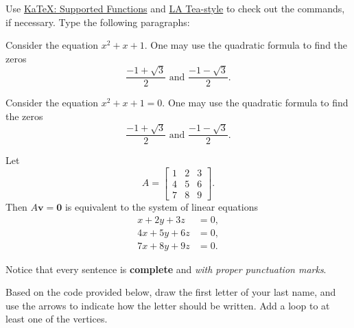 \documentclass{article}
\theoremstyle{definition}
\newcommand{\bzero}{\mathbf{0}}
\newcommand{\bv}{\mathbf{v}}
\begin{document}
Use \href{https://katex.org/docs/supported.html}{KaTeX: Supported Functions} and \href{https://sagelabtw.github.io/LA-Tea/style.html}{LA Tea-style} to check out the commands, if necessary.  Type the following paragraphs:
\medskip

Consider the equation $x^2 + x + 1$.  One may use the quadratic formula to find the zeros
\[\frac{-1 + \sqrt{3}}{2}
\text{ and }
\frac{-1 - \sqrt{3}}{2}.\]





Consider the equation $x^2 + x + 1 = 0$.  One may use the quadratic formula to find the zeros  
\[\frac{-1+\sqrt{3}}{2} \text{ and } \frac{-1-\sqrt{3}}{2}.\]

Let 
\[A = \begin{bmatrix}
 1 & 2 & 3 \\
 4 & 5 & 6 \\
 7 & 8 & 9
\end{bmatrix}.\]
Then $A\bv = \bzero$ is equivalent to the system of linear equations
\[\begin{aligned}
 x + 2y + 3z &= 0, \\
 4x + 5y + 6z &= 0, \\
 7x + 8y + 9z &= 0.
\end{aligned}\]

Notice that every sentence is \textbf{complete} and \emph{with proper punctuation marks}.

\bigskip

Based on the code provided below, draw the first letter of your last name, and use the arrows to indicate how the letter should be written.  Add a loop to at least one of the vertices.
\medskip

\begin{center}
\end{center}
\end{document}
